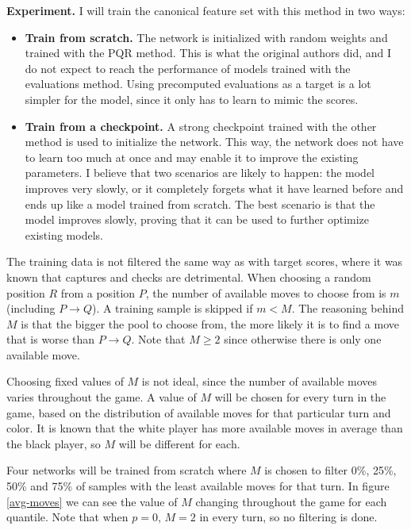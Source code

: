 \newpage
\textbf{Experiment.} I will train the canonical  feature set with this method in two ways:

\begin{itemize}
\item \textbf{Train from scratch.} The network is initialized with random weights and trained with the PQR method. This is what the original authors did, and I do not expect to reach the performance of models trained with the evaluations method. Using precomputed evaluations as a target is a lot simpler for the model, since it only has to learn to mimic the scores.

\item \textbf{Train from a checkpoint.} A strong checkpoint trained with the other method is used to initialize the network. This way, the network does not have to learn too much at once and may enable it to improve the existing parameters. I believe that two scenarios are likely to happen: the model improves very slowly, or it completely forgets what it have learned before and ends up like a model trained from scratch. The best scenario is that the model improves slowly, proving that it can be used to further optimize existing models.
\end{itemize}

The training data is not filtered the same way as with target scores, where it was known that captures and checks are detrimental. When choosing a random position $R$ from a position $P$, the number of available moves to choose from is $m$ (including $P \rightarrow Q$). A training sample is skipped if $m < M$. The reasoning behind $M$ is that the bigger the pool to choose from, the more likely it is to find a move that is worse than $P \rightarrow Q$. Note that $M \geq 2$ since otherwise there is only one available move.

Choosing fixed values of $M$ is not ideal, since the number of available moves varies throughout the game. A value of $M$ will be chosen for every turn in the game, based on the distribution of available moves for that particular turn and color. It is known that the white player has more available moves in average than the black player, so $M$ will be different for each.

Four networks will be trained from scratch where $M$ is chosen to filter 0\%, 25\%, 50\% and 75\% of samples with the least available moves for that turn. In figure \ref{avg-moves} we can see the value of $M$ changing throughout the game for each quantile. Note that when $p=0$, $M=2$ in every turn, so no filtering is done. \\


